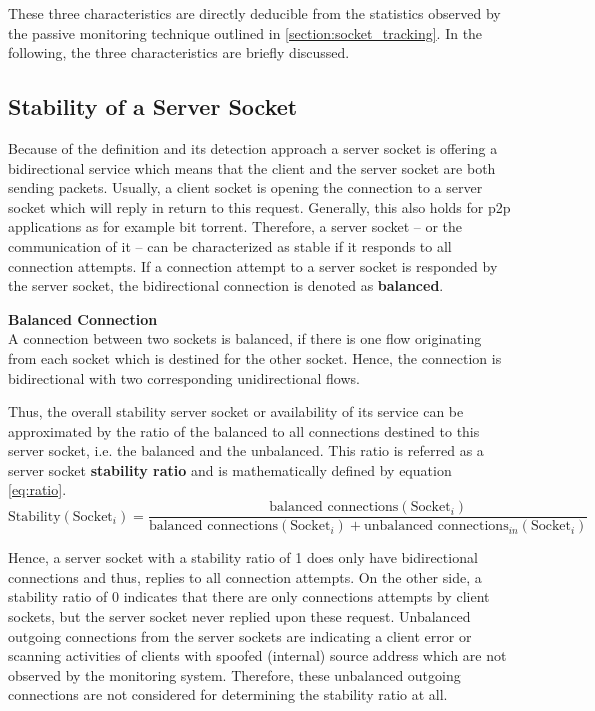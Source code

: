 These three characteristics are directly deducible from the statistics observed by the passive monitoring technique outlined in \ref{section:socket_tracking}. In the following, the three characteristics are briefly discussed.

\subsection{Stability of a Server Socket}
Because of the definition and its detection approach a \gls{server socket} is offering a bidirectional service which means that the client and the \gls{server socket} are both sending packets. Usually, a client socket is opening the connection to a \gls{server socket} which will reply in return to this request. Generally, this also holds for \gls{p2p} applications as for example bit torrent. Therefore, a \gls{server socket} -- or the communication of it -- can be characterized as stable if it responds to all connection attempts. If a connection attempt to a \gls{server socket} is responded by the \gls{server socket}, the bidirectional connection is denoted as \textbf{balanced}.

\parbox{
\textwidth}{
\begin{defn}
	{\textbf{Balanced Connection}\\} A connection between two sockets is balanced, if there is one flow originating from each socket which is destined for the other socket. Hence, the connection is bidirectional with two corresponding unidirectional flows.
\end{defn}
}

Thus, the overall stability \gls{server socket} or availability of its service can be approximated by the ratio of the balanced to all connections destined to this \gls{server socket}, i.e. the balanced and the unbalanced. This ratio is referred as a \gls{server socket} \textbf{stability ratio} and is mathematically defined by equation \ref{eq:ratio}.
\begin{equation}
	\text{Stability}(\text{Socket}_i) = \frac{\text{balanced connections}(\text{Socket}_i)}{\text{balanced connections}(\text{Socket}_i) + \text{unbalanced connections}_{in}(\text{Socket}_i)}
	\label{eq:ratio}
\end{equation}

Hence, a \gls{server socket} with a stability ratio of 1 does only have bidirectional connections and thus, replies to all connection attempts. On the other side, a stability ratio of 0 indicates that there are only connections attempts by client sockets, but the \gls{server socket} never replied upon these request. Unbalanced outgoing connections from the \glspl{server socket} are indicating a client error or scanning activities of clients with spoofed (internal) source address which are not observed by the monitoring system. 
Therefore, these unbalanced outgoing connections are not considered for determining the stability ratio at all.

